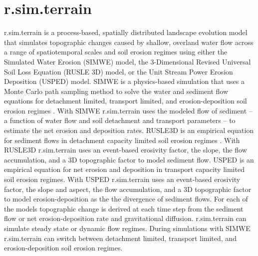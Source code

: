 \documentclass[esurf, manuscript]{copernicus}
\begin{document}
\section{r.sim.terrain}
\lowercase{r.sim.terrain}
is a process-based, spatially distributed landscape evolution model
that simulates topographic changes
caused by shallow, overland water flow
across a range of spatiotemporal scales and soil erosion regimes
using either
the Simulated Water Erosion (SIMWE) model, 
the 3-Dimensional Revised Universal Soil Loss Equation (RUSLE 3D) model,
or the Unit Stream Power Erosion Deposition (USPED) model.  
SIMWE is a physics-based simulation
that uses a Monte Carlo path sampling method
to solve the water and sediment flow equations 
for detachment limited, transport limited, and erosion-deposition 
soil erosion regimes \citep{Mitasova2004}. 
With SIMWE 
\lowercase{r.sim.terrain}
uses the modeled flow of sediment 
-- a function of water flow and soil detachment and transport parameters -- 
to estimate the net erosion and deposition rates. 
RUSLE3D is an empirical equation for sediment flows 
in detachment capacity limited soil erosion regimes \citep{Mitasova1996}. 
With RUSLE3D
\lowercase{r.sim.terrain}
uses an event-based erosivity factor, 
the slope, the flow accumulation, and a 3D topographic factor
to model sediment flow. 
USPED is an empirical equation for net erosion and deposition 
in transport capacity limited soil erosion regimes. 
With USPED 
\lowercase{r.sim.terrain}
uses an event-based erosivity factor, 
the slope and aspect, the flow accumulation, and a 3D topographic factor
to model erosion-deposition as the
the divergence of sediment flows. 
For each of the models 
topographic change is derived at each time step
from the sediment flow or net erosion-deposition rate
and gravitational diffusion.
\lowercase{r.sim.terrain} 
can simulate steady state or dynamic flow regimes.
During simulations with SIMWE 
\lowercase{r.sim.terrain}
can switch between 
detachment limited, transport limited, and erosion-deposition 
soil erosion regimes.
\end{document}
